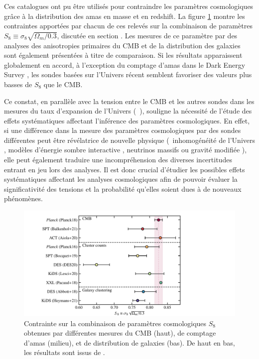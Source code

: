 Ces catalogues ont pu être utilisés pour contraindre les paramètres cosmologiques grâce à la distribution des amas en masse et en redshift.
La figure \ref{fig:cluster_S8} montre les contraintes apportées par chacun de ces relevés sur la combinaison de paramètres $S_8 \equiv \sigma_8 \sqrt{\Omega_m/0.3}$, discutée en section .
Les mesures de ce paramètre par des analyses des anisotropies primaires du CMB et de la distribution des galaxies sont également présentées à titre de comparaison.
Si les résultats apparaissent globalement en accord, à l'exception du comptage d'amas dans le Dark Energy Survey \cite{des_collaboration_dark_2020}, les sondes basées sur l'Univers récent semblent favoriser des valeurs plus basses de $S_8$ que le CMB.

Ce constat, en parallèle avec la tension entre le CMB et les autres sondes dans les mesures du taux d'expansion de l'Univers (\eg\ \cite{riess_large_2019,wong_h0licow_2020,efstathiou_h0_2021}), souligne la nécessité de l'étude des effets systématiques affectant l'inférence des paramètres cosmologiques.
En effet, si une différence dans la mesure des paramètres cosmologiques par des sondes différentes peut être révélatrice de nouvelle physique (\eg\ inhomogénéité de l'Univers \cite{bohringer_observational_2020}, modèles d'énergie sombre interactive \cite{di_valentino_interacting_2020}, neutrinos massifs \cite{bolliet_including_2020} ou gravité modifiée \cite{cataneo_tests_2018}), elle peut également traduire une incompréhension des diverses incertitudes entrant en jeu lors des analyses.
Il est donc crucial d'étudier les possibles effets systématiques affectant les analyses cosmologiques afin de pouvoir évaluer la significativité des tensions et la probabilité qu'elles soient dues à de nouveaux phénomènes.

\begin{figure}[t]
    \centering
    \includegraphics[width=.9\linewidth]{Figures/Chap_amas/S8.pdf}
    \caption{
        Contrainte sur la combinaison de paramètres cosmologiques $S_8$ obtenues par différentes mesures du CMB (haut), de comptage d'amas (milieu), et de distribution de galaxies (bas).
        De haut en bas, les résultats sont issus de \cite{planck_collaboration_planck_2020}\cite{balkenhol_constraints_2021}\cite{aiola_atacama_2020}\cite{planck_collaboration_planck_2016-2}\cite{bocquet_cluster_2019}\cite{des_collaboration_dark_2020}\cite{lesci_amico_2020}\cite{pacaud_xxl_2018}\cite{abbott_dark_2018}\cite{heymans_kids-1000_2021}.
    }
    \label{fig:cluster_S8}
\end{figure}

